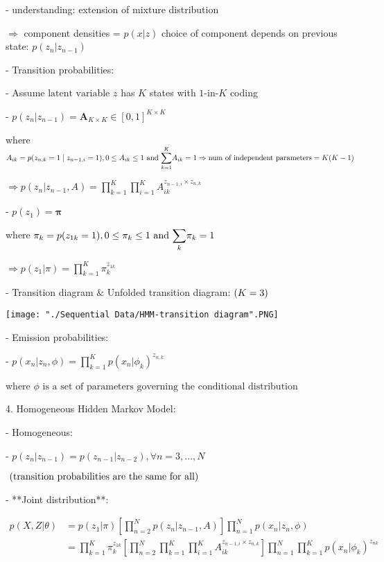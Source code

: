      - understanding: extension of mixture distribution

       $\Rightarrow$ 	component densities = $p(x|z)$ 
       choice of component depends on previous state: $p(z_n|z_{n-1})$ 

   - Transition probabilities:

     - Assume $\text{latent variable }z$ has $K$ states with $1$-in-$K$ coding

     - $p(z_n|z_{n-1}) = \boldsymbol A_{K\times K}\in [0,1]^{K\times K}$   

       where $A_{ik}=p(z_{n,k}=1 \mid z_{n-1,i}=1), \space 0 \le A_{ik}\le 1 \text{ and } \small{\displaystyle \sum_{k=1}^K} \normalsize A_{ik} = 1 \\ \Rightarrow \text{num of independent parameters}=K(K-1) $ 

       $\Rightarrow \displaystyle p(z_n|z_{n-1},A) = \prod_{k=1}^K \prod_{i=1}^K A_{ik}^{z_{n-1,i} \times z_{n,k}}$ 

     - $p(z_1) = \mathbf \pi$ 

       where $\pi_k = p(z_{1k}=1), 0\le\pi_k \le 1  \text{ and } \space \small {\displaystyle\sum_k} \normalsize \pi_k=1$ 

       $\displaystyle \Rightarrow p(z_1|\pi) = \prod_{k=1}^K \pi_k^{z_{1k}}$ 

     - Transition diagram $\&$ Unfolded transition diagram: $\space \small (K=3)$ 

		\texttt{[image: "./Sequential Data/HMM-transition diagram".PNG]}

   - Emission probabilities:

     - $\displaystyle p(x_n|z_n,\phi) = \prod_{k=1}^K p(x_n|\phi_k)^{z_{n,k}}$ 

       where $\phi \text{ is a set of parameters governing the conditional distribution}$ 

4. Homogeneous Hidden Markov Model:

   - Homogeneous:

     - $p(z_n|z_{n-1}) = p(z_{n-1}|z_{n-2}), \forall n=3,...,N$ 

       $\space \text{ (transition probabilities are the same for all)}$ 

   - **Joint distribution**: 

     \begin{align} \displaystyle p(X,Z|\theta) &= p(z_1|\pi) \left[\prod_{n=2}^N p(z_n|z_{n-1},A)\right] \prod_{n=1}^N p(x_n|z_n,\phi) \\ &= \prod_{k=1}^K \pi_k^{z_{1k}} \left[ \prod_{n=2}^N  \prod_{k=1}^K \prod_{i=1}^K A_{ik}^{z_{n-1,i} \times z_{n,k}} \right] \prod_{n=1}^N \prod_{k=1}^Kp(x_n|\phi_k)^{z_{nk}}\end{align}


